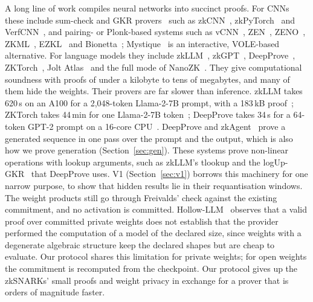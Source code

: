  A long line of work compiles neural networks into succinct
proofs. For CNNs these include sum-check and GKR provers~\cite{gkr} such as zkCNN~\cite{zkcnn},
zkPyTorch~\cite{zkpytorch} and VerfCNN~\cite{verfcnn}, and pairing- or Plonk-based systems such as
vCNN~\cite{vcnn}, ZEN~\cite{zen}, ZENO~\cite{zeno}, ZKML~\cite{zkml}, EZKL~\cite{ezkl} and
Bionetta~\cite{bionetta}; Mystique~\cite{mystique} is an interactive, VOLE-based alternative. For
language models they include zkLLM~\cite{zkllm}, zkGPT~\cite{zkgpt}, DeepProve~\cite{deepprove},
ZKTorch~\cite{zktorch}, Jolt Atlas~\cite{joltatlas} and the full mode of NanoZK~\cite{nanozk}. They
give computational soundness with proofs of under a kilobyte to tens of megabytes, and many of them
hide the weights. Their provers are far slower than inference. zkLLM takes 620\,s on an A100 for a
2{,}048-token Llama-2-7B prompt, with a 183\,kB proof~\cite{zkllm}; ZKTorch takes 44\,min for one
Llama-2-7B token~\cite{zktorch}; DeepProve takes 34\,s for a 64-token GPT-2 prompt on a 16-core
CPU~\cite{deepprove}. DeepProve and zkAgent~\cite{zkagent} prove a generated sequence in one pass
over the prompt and the output, which is also how we prove generation (Section~\ref{sec:gen}). These
systems prove non-linear operations with lookup arguments, such as zkLLM's tlookup and the
logUp-GKR~\cite{papini2023logupgkr} that DeepProve uses. V1 (Section~\ref{sec:v1}) borrows this
machinery for one narrow purpose, to show that hidden results lie in their requantisation windows.
The weight products still go through Freivalds' check against the existing commitment, and no
activation is committed. Hollow-LLM~\cite{hollowllm} observes that a valid proof over committed
private weights does not establish that the provider performed the computation of a model of the
declared size, since weights with a degenerate algebraic structure keep the declared shapes but are
cheap to evaluate. Our protocol shares this limitation for private weights; for open weights the
commitment is recomputed from the checkpoint. Our protocol gives up the zkSNARKs' small proofs and
weight privacy in exchange for a prover that is orders of magnitude faster.

